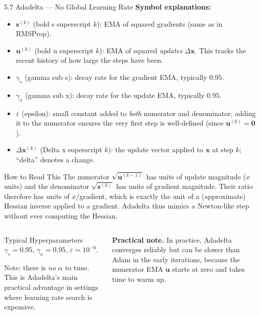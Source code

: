 \documentclass[aspectratio=169,10pt]{beamer}
\newcommand{\vx}{\mathbf{x}}
\newcommand{\vs}{\mathbf{s}}
\newcommand{\vu}{\mathbf{u}}
\begin{document}
\begin{frame}[allowframebreaks]{5.7 Adadelta --- No Global Learning Rate}
  \textbf{Symbol explanations:}
  \begin{itemize}
    \item $\vs^{(k)}$ (bold s superscript $k$): EMA of
          squared gradients (same as in RMSProp).
    \item $\vu^{(k)}$ (bold u superscript $k$): EMA of
          squared \emph{updates} $\Delta\vx$.
          This tracks the recent history of how large the
          steps have been.
    \item $\gamma_s$ (gamma sub s): decay rate for the
          gradient EMA, typically $0.95$.
    \item $\gamma_x$ (gamma sub x): decay rate for the
          update EMA, typically $0.95$.
    \item $\varepsilon$ (epsilon): small constant added
          to \emph{both} numerator and denominator;
          adding it to the numerator ensures the very
          first step is well-defined (since $\vu^{(0)}=\mathbf{0}$).
    \item $\Delta\vx^{(k)}$ (Delta x superscript $k$):
          the update vector applied to $\vx$ at step $k$;
          ``delta'' denotes a change.
  \end{itemize}

  \begin{alertblock}{How to Read This}
    The numerator $\sqrt{\vu^{(k-1)}}$ has units of update
    magnitude ($x$ units) and the denominator
    $\sqrt{\vs^{(k)}}$ has units of gradient magnitude.
    Their ratio therefore has units of $x$/gradient, which
    is exactly the unit of a (approximate) Hessian inverse
    applied to a gradient.  Adadelta thus mimics a
    Newton-like step without ever computing the Hessian.
  \end{alertblock}

  \begin{columns}[T]
      \begin{block}{Typical Hyperparameters}
        \footnotesize
        $\gamma_s = 0.95$, \; $\gamma_x = 0.95$, \;
        $\varepsilon = 10^{-6}$.

        Note: there is \emph{no} $\alpha$ to tune.  This is
        Adadelta's main practical advantage in settings where
        learning rate search is expensive.
      \end{block}

      \vspace{0.5em}
      \textbf{Practical note.}  In practice, Adadelta converges
      reliably but can be slower than Adam in the early
      iterations, because the numerator EMA $\vu$ starts at
      zero and takes time to warm up.


\end{columns}
\end{frame}
\end{document}
